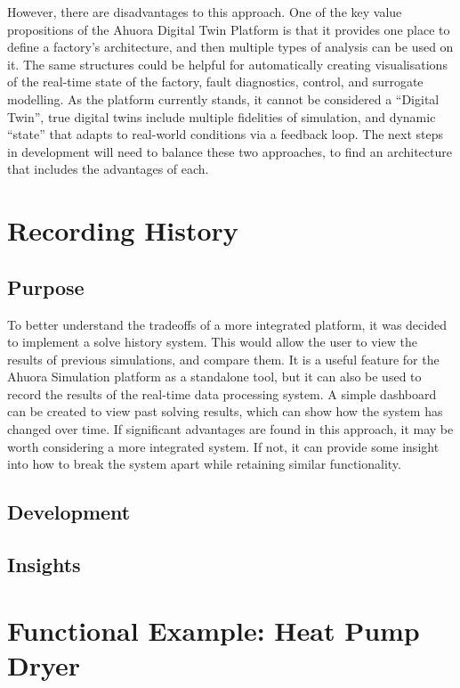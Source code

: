 \documentclass[12pt]{report}
\begin{document}
However, there are disadvantages to this approach. One of the key value propositions of the Ahuora Digital Twin Platform is that it provides one place to define a factory's architecture, and then multiple types of analysis can be used on it. The same structures could be helpful for automatically creating visualisations of the real-time state of the factory, fault diagnostics, control, and surrogate modelling. As the platform currently stands, it cannot be considered a ``Digital Twin'', true digital twins include multiple fidelities of simulation, and dynamic ``state'' that adapts to real-world conditions via a feedback loop. The next steps in development will need to balance these two approaches, to find an architecture that includes the advantages of each.


\chapter{Recording History}

\section{Purpose}

To better understand the tradeoffs of a more integrated platform, it was decided to implement a solve history system. This would allow the user to view the results of previous simulations, and compare them. It is a useful feature for the Ahuora Simulation platform as a standalone tool, but it can also be used to record the results of the real-time data processing system. A simple dashboard can be created to view past solving results, which can show how the system has changed over time. If significant advantages are found in this approach, it may be worth considering a more integrated system. If not, it can provide some insight into how to break the system apart while retaining similar functionality.


\section{Development}


\section{Insights}




\chapter{Functional Example: Heat Pump Dryer}
\end{document}

